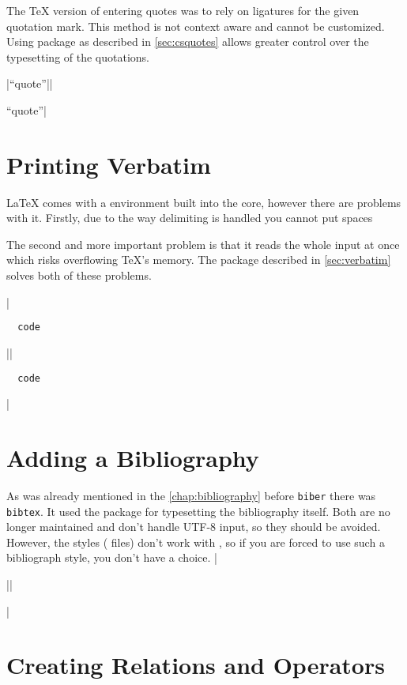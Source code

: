 The \TeX{} version of entering quotes was to rely on ligatures for the given
quotation mark. This method is not context aware and cannot be customized.
Using  package as described in \autoref{sec:csquotes} allows
greater control over the typesetting of the quotations.

\chto|``quote''||\usepackage{csquotes}
\enquote{quote}|

\section{Printing Verbatim}

\LaTeX{} comes with a  environment built into the core, however there are problems
with it. Firstly, due to the way delimiting is handled you cannot put spaces
The second and more important problem is that it reads the whole input at once
which risks overflowing \TeX{}'s memory. The  package described
in \autoref{sec:verbatim} solves both of these problems.
\begin{chktexignore}
\chto|\begin{verbatim}
  code
\end{verbatim}||\usepackage{verbatim}
\begin{verbatim}
  code
\end{verbatim}|
\end{chktexignore}

\section{Adding a Bibliography}

As was already mentioned in the \autoref{chap:bibliography} before
\texttt{biber} there was \texttt{bibtex}. It used the  package for
typesetting the bibliography itself. Both are no longer maintained and
don't handle UTF-8 input, so they should be avoided. However, the 
styles ( files) don't work with , so if you are forced to
use such a bibliograph style, you don't have a choice.
\chto|\usepackage{natbib}||\usepackage{biblatex}|

\section{Creating Relations and Operators}

